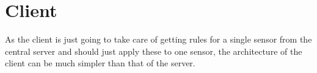 \section{Client}

As the client is just going to take care of getting rules for a single sensor
from the central server and should just apply these to one sensor, the
architecture of the client can be much simpler than that of the server.



